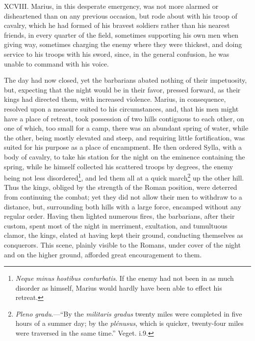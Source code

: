 XCVIII. Marius, in this desperate emergency, was not more alarmed or
disheartened than on any previous occasion, but rode about with his
troop of cavalry, which he had formed of his bravest soldiers rather
than his nearest friends, in every quarter of the field, sometimes
supporting his own men when giving way, sometimes charging the enemy
where they were thickest, and doing service to his troops with his
sword, since, in the general confusion, he was unable to command with
his voice.

The day had now closed, yet the barbarians abated nothing of their
impetuosity, but, expecting that the night would be in their favor,
pressed forward, as their kings had directed them, with increased
violence. Marius, in consequence, resolved upon a measure suited to
his circumstances, and, that his men might have a place of retreat,
took possession of two hills contiguous to each other, on one of
which, too small for a camp, there was an abundant spring of water,
while the other, being mostly elevated and steep, and requiring little
fortification, was suited for his purpose as a place of encampment. He
then ordered Sylla, with a body of cavalry, to take his station for
the night on the eminence containing the spring, while he himself
collected his scattered troops by degrees, the enemy being not less
disordered\footnote{\emph{Neque minus hostibus conturbatis}. If the enemy had not been
in as much disorder as himself, Marius would hardly have been able to
effect his retreat.}, and led them all at a quick march\footnote{\emph{Pleno gradu}.—``By the \emph{militaris gradus} twenty miles were
completed in five hours of a summer day; by the \emph{plénusus}, which is
quicker, twenty-four miles were traversed in the same time.'' Veget. i.9.} up the other
hill. Thus the kings, obliged by the strength of the Roman position,
were deterred from continuing the combat; yet they did not allow their
men to withdraw to a distance, but, surrounding both hills with a
large force, encamped without any regular order. Having then lighted
numerous fires, the barbarians, after their custom, spent most of the
night in merriment, exultation, and tumultuous clamor, the kings,
elated at having kept their ground, conducting themselves as
conquerors. This scene, plainly visible to the Romans, under cover of
the night and on the higher ground, afforded great encouragement to
them.

